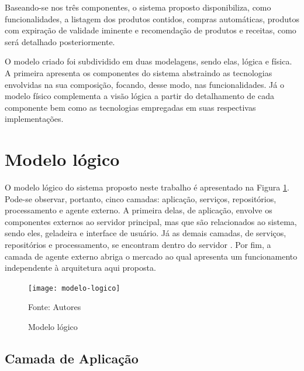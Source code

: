 Baseando-se nos três componentes, o sistema proposto disponibiliza, como funcionalidades, a listagem dos produtos contidos, compras automáticas, produtos com expiração de validade iminente e recomendação de produtos e receitas, como será detalhado posteriormente.
    
    
O modelo criado foi subdividido em duas modelagens, sendo elas, lógica e física. A primeira apresenta os componentes do sistema abstraindo as tecnologias envolvidas na sua composição, focando, desse modo, nas funcionalidades. Já o modelo físico complementa a visão lógica a partir do detalhamento de cada componente bem como as tecnologias empregadas em suas respectivas implementações.

\section{Modelo lógico}

O modelo lógico do sistema proposto neste trabalho é apresentado na Figura \ref{fig:c4_modelo_logico}. Pode-se observar, portanto, cinco camadas: aplicação, serviços, repositórios, processamento e agente externo. A primeira delas, de aplicação, envolve os componentes externos ao servidor principal, mas que são relacionados ao sistema, sendo eles, geladeira e interface de usuário. Já as demais camadas, de serviços, repositórios e processamento, se encontram dentro do servidor%
. Por fim, a camada de agente externo abriga o mercado ao qual apresenta um funcionamento independente à arquitetura aqui proposta.


\begin{figure}[htb]
    \caption{Modelo lógico}
    \label{fig:c4_modelo_logico}
    \texttt{[image: modelo-logico]}
    
    Fonte: Autores
\end{figure}
\nocite{Freepik2017} %

\subsection{Camada de Aplicação}


